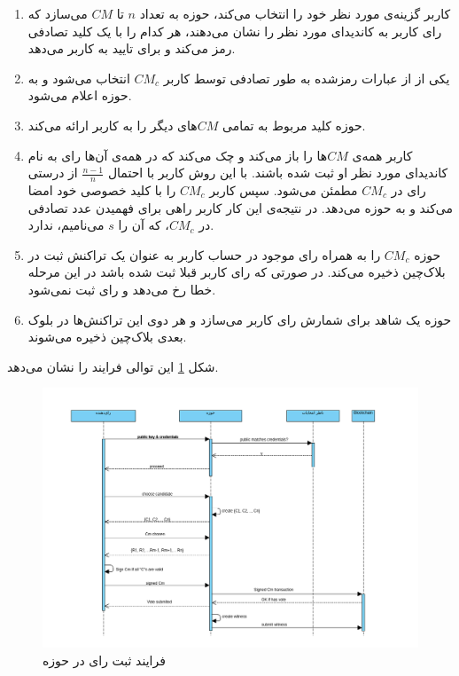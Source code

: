 \begin{enumerate}
	\item 
	کاربر گزینه‌ی مورد نظر خود را انتخاب می‌کند، حوزه به تعداد $n$ تا $CM$ می‌سازد که رای کاربر به کاندیدای مورد نظر را نشان می‌دهند، هر کدام را با یک کلید تصادفی رمز می‌کند و برای تایید به کاربر می‌دهد. 
	\item 
	یکی از از عبارات رمزشده به طور تصادفی توسط کاربر $CM_c$ انتخاب می‌شود و به حوزه اعلام می‌شود.
	\item 
	حوزه کلید مربوط به تمامی $CM$های دیگر را به کاربر ارائه می‌کند.
	\item 
	کاربر همه‌ی $CM$ها را باز می‌کند و چک می‌کند که در همه‌ی آن‌ها رای به نام کاندیدای مورد نظر او ثبت شده باشند. با این روش کاربر با احتمال $\frac{n-1}{n}$ از درستی رای در $CM_c$ مطمئن می‌شود. سپس کاربر $CM_c$ را با کلید خصوصی خود امضا می‌کند و به حوزه می‌دهد. در نتیجه‌ی این کار کاربر راهی برای فهمیدن عدد تصادفی در $CM_c$، که آن را $s$ می‌نامیم، ندارد.
	\item
	حوزه $CM_c$ را به همراه رای موجود در حساب کاربر به عنوان یک تراکنش ثبت در بلاک‌چین ذخیره می‌کند. در صورتی که رای کاربر قبلا ثبت شده باشد در این مرحله خطا رخ می‌دهد و رای ثبت نمی‌شود. 
	\item
	حوزه یک شاهد برای شمارش رای کاربر می‌سازد و هر دوی این تراکنش‌ها در بلوک بعدی بلاک‌چین ذخیره می‌شوند.
\end{enumerate}
شکل \ref{fig:seqdiag.png} این توالی فرایند را نشان می‌دهد.
\begin{figure}[t!]
	\centering
	\includegraphics[width=1\linewidth]{seqdiag.png}
	\caption {فرایند ثبت رای در حوزه}
	\label{fig:seqdiag.png}
\end{figure}

